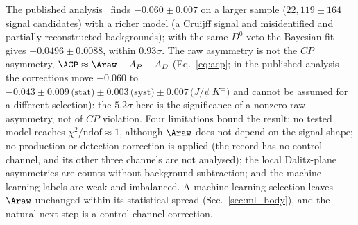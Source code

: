 \label{sec:comparison_published}
The published analysis~\cite{lhcb_cpv_2013} finds $-0.060\pm0.007$ on a larger sample ($22{,}119\pm164$ signal candidates) with a richer model (a Cruijff signal and misidentified and partially reconstructed backgrounds); with the same $D^0$ veto the Bayesian fit gives $-0.0496\pm0.0088$, within $0.93\sigma$. The raw asymmetry is not the $CP$ asymmetry, $\ACP\approx\Araw-A_P-A_D$ (Eq.~\eqref{eq:acp}; in the published analysis the corrections move $-0.060$ to $-0.043\pm0.009 \,\text{(stat)}\pm0.003\,\text{(syst)}\pm0.007\,\text{($J/\psi\, K^{\pm}$)}$ and cannot be assumed for a different selection): the $5.2\sigma$ here is the significance of a nonzero raw asymmetry, not of $CP$ violation. Four limitations bound the result: no tested model reaches $\chi^2/\mathrm{ndof}\approx1$, although $\Araw$ does not depend on the signal shape; no production or detection correction is applied (the record has no control channel, and its other three channels are not analysed); the local Dalitz-plane asymmetries are counts without background subtraction; and the machine-learning labels are weak and imbalanced. A machine-learning selection leaves $\Araw$ unchanged within its statistical spread (Sec.~\ref{sec:ml_body}), and the natural next step is a control-channel correction.

